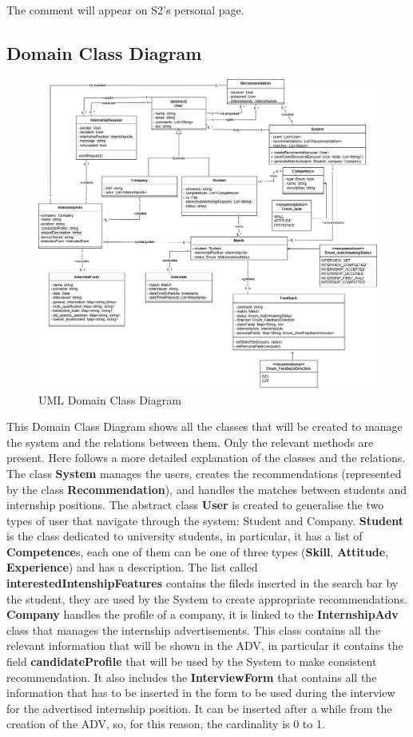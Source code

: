 The comment will appear on S2's personal page.

\subsection{Domain Class Diagram}
\begin{figure}[H]
    \centering
    \includegraphics[width=15cm]{Images/RASD-Domain Class Diagram.drawio.png}
    \caption{UML Domain Class Diagram}
\end{figure}
This Domain Class Diagram shows all the classes that will be created to manage the system and the relations between them. Only the relevant methods are present.
Here follows a more detailed explanation of the classes and the relations.\newline
The class \textbf{System} manages the users, creates the recommendations (represented by the class \textbf{Recommendation}), and handles the matches between students and internship positions. The abstract class \textbf{User} is created to generalise the two types of user that navigate through the system: Student and Company. \textbf{Student} is the class dedicated to university students, in particular, it has a list of \textbf{Competence}s, each one of them can be one of three types (\textbf{Skill}, \textbf{Attitude}, \textbf{Experience}) and has a description. The list called \textbf{interestedIntenshipFeatures} contains the fileds inserted in the search bar by the student, they are used by the System to create appropriate recommendations. \textbf{Company} handles the profile of a company, it is linked to the \textbf{InternshipAdv} class that manages the internship advertisements. This class contains all the relevant information that will be shown in the ADV, in particular it contains the field \textbf{candidateProfile} that will be used by the System to make consistent recommendation. It also includes the \textbf{InterviewForm} that contains all the information that has to be inserted in the form to be used during the interview for the advertised internship position. It can be inserted after a while from the creation of the ADV, so, for this reason, the cardinality is 0 to 1.\newline
